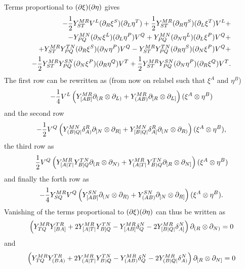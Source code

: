 \documentclass{article}
\begin{document}
Terms proportional to $(\partial\xi)(\partial\eta)$ gives
\begin{align}
    -\frac{1}{2}Y^{MR}_{ST}V^L(\partial_R\xi^S)(\partial_L\eta^T)+\frac{1}{2}Y^{MR}_{ST}(\partial_R\eta^S)(\partial_L\xi^T)V^L+\\
    -Y^{MN}_{PQ}(\partial_N\xi^L)(\partial_L\eta^P)V^Q+Y^{MN}_{PQ}(\partial_N\eta^L)(\partial_L\xi^P)V^Q+\\
    +Y^{MR}_{ST}Y^{TN}_{PQ}(\partial_R\xi^S)(\partial_N\eta^P)V^Q-Y^{MR}_{ST}Y^{TN}_{PQ}(\partial_R\eta^S)(\partial_N\xi^P)V^Q+\\
    -\frac{1}{2}Y^{MR}_{ST}Y^{SN}_{PQ}(\partial_N\xi^P)(\partial_R\eta^Q)V^T+\frac{1}{2}Y^{MR}_{ST}Y^{SN}_{PQ}(\partial_N\eta^P)(\partial_R\xi^Q)V^T.
\end{align}
The first row can be rewritten as (from now on relabel such that $\xi^A$ and $\eta^B$)
\begin{align}
    -\frac{1}{4}V^L\left(Y^{MR}_{[AB]}\partial_{(R}\otimes\partial_{L)}+Y^{MR}_{(AB)}\partial_{[R}\otimes\partial_{L]}\right)(\xi^A\otimes \eta^B)
\end{align}
and the second row
\begin{align}
    -\frac{1}{2}V^Q\left(Y^{MN}_{(B|Q|}\delta^R_{A)}\partial_{[N}\otimes\partial_{R]}+Y^{MN}_{[B|Q|}\delta^R_{A]}\partial_{(N}\otimes\partial_{R)}\right)(\xi^A\otimes \eta^B),
\end{align}
the third row as 
\begin{align}
    \frac{1}{2}V^Q\left(Y^{MR}_{[A|T|}Y^{TN}_{B]Q}\partial_{(R}\otimes\partial_{N)}+Y^{MR}_{(A|T|}Y^{TN}_{B)Q}\partial_{[R}\otimes\partial_{N]}\right)(\xi^A\otimes \eta^B)
\end{align}
and finally the forth row as 
\begin{align}
    -\frac{1}{4}Y^{MR}_{SQ}V^Q\left(Y^{SN}_{[AB]}\partial_{(N}\otimes\partial_{R)}+Y^{SN}_{(AB)}\partial_{[N}\otimes\partial_{R]}\right)(\xi^A\otimes \eta^B).
\end{align}
Vanishing of the terms proportional to $(\partial\xi)(\partial\eta)$ can thus be written as 
\begin{align}
\left(Y^{MR}_{TQ}Y^{TR}_{[BA]}+2Y^{MR}_{[A|T|}Y^{TN}_{B]Q}-Y^{MR}_{[AB]}\delta_Q^N-2Y^{MR}_{[B|Q|}\delta^N_{A]}\right)\partial_{(R}\otimes\partial_{N)}=0
\end{align}
and
\begin{align}
\left(Y^{MR}_{TQ}Y^{TR}_{(BA)}+2Y^{MR}_{(A|T|}Y^{TN}_{B)Q}-Y^{MR}_{(AB)}\delta_Q^N-2Y^{MR}_{(B|Q|}\delta^N_{A)}\right)\partial_{[R}\otimes\partial_{N]}=0
\end{align}
\end{document}
